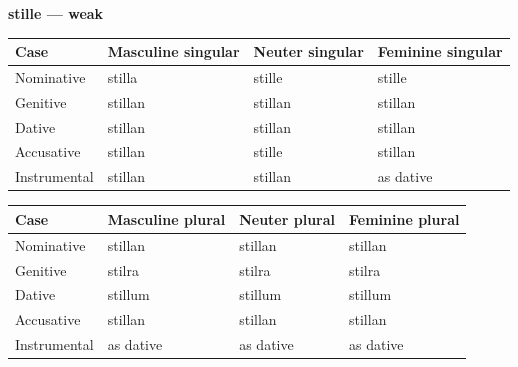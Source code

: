 \textbf{stille — weak}

\par\begingroup
\fontsize{10.5}{13.2}\selectfont
\setlength{\LTleft}{0pt}\setlength{\LTright}{\fill}
\noindent
\begin{tabular}{@{}>{\raggedright\arraybackslash}p{22.0mm}>{\raggedright\arraybackslash}p{31.188mm}>{\raggedright\arraybackslash}p{31.188mm}>{\raggedright\arraybackslash}p{31.188mm}@{}}
\toprule
\textbf{Case} & \textbf{Masculine singular} & \textbf{Neuter singular} & \textbf{Feminine singular} \\
\midrule
Nominative & stilla & stille & stille \\
Genitive & stillan & stillan & stillan \\
Dative & stillan & stillan & stillan \\
Accusative & stillan & stille & stillan \\
Instrumental & stillan & stillan & as dative \\
\bottomrule
\end{tabular}
\par\endgroup
\par\addvspace{5pt}
\par\begingroup
\fontsize{10.5}{13.2}\selectfont
\setlength{\LTleft}{0pt}\setlength{\LTright}{\fill}
\noindent
\begin{tabular}{@{}>{\raggedright\arraybackslash}p{22.0mm}>{\raggedright\arraybackslash}p{31.188mm}>{\raggedright\arraybackslash}p{31.188mm}>{\raggedright\arraybackslash}p{31.188mm}@{}}
\toprule
\textbf{Case} & \textbf{Masculine plural} & \textbf{Neuter plural} & \textbf{Feminine plural} \\
\midrule
Nominative & stillan & stillan & stillan \\
Genitive & stilra & stilra & stilra \\
Dative & stillum & stillum & stillum \\
Accusative & stillan & stillan & stillan \\
Instrumental & as dative & as dative & as dative \\
\bottomrule
\end{tabular}
\par\endgroup

